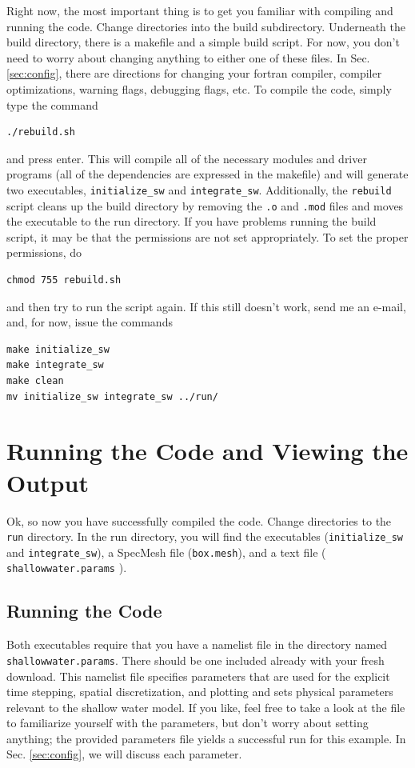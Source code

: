 \documentclass{softwaremanual}
\begin{document}
Right now, the most important thing is to get you familiar with compiling and running the code. Change directories into the build subdirectory. Underneath the build directory, there is a makefile and a simple build script. For now, you don't need to worry about changing anything to either one of these files. In Sec. \ref{sec:config}, there are directions for changing your fortran compiler, compiler optimizations, warning flags, debugging flags, etc. To compile the code, simply type the command
\begin{verbatim}
./rebuild.sh
\end{verbatim}
and press enter. This will compile all of the necessary modules and  driver programs (all of the dependencies are expressed in the makefile) and will generate two executables, \texttt{initialize\_sw} and \texttt{integrate\_sw}. Additionally, the \texttt{rebuild} script cleans up the build directory by removing the \texttt{.o} and \texttt{.mod} files and moves the executable to the run directory. If you have problems running the build script, it may be that the permissions are not set appropriately. To set the proper permissions, do
\begin{verbatim}
chmod 755 rebuild.sh
\end{verbatim}
and then try to run the script again. If this still doesn't work, send me an e-mail, and, for now, issue the commands
\begin{verbatim}
make initialize_sw
make integrate_sw
make clean
mv initialize_sw integrate_sw ../run/
\end{verbatim}

\section{Running the Code and Viewing the Output}
Ok, so now you have successfully compiled the code. Change directories to the \texttt{run} directory. In the run directory, you will find the executables (\texttt{initialize\_sw} and \texttt{integrate\_sw}), a SpecMesh file (\texttt{box.mesh}), and a text file ( \texttt{shallowwater.params} ).

\subsection{Running the Code}
Both executables require that you have a namelist file in the directory named \texttt{shallowwater.params}. There should be one included already with your fresh download. This namelist file specifies parameters that are used for the explicit time stepping, spatial discretization, and plotting and sets physical parameters relevant to the shallow water model. If you like, feel free to take a look at the file to familiarize yourself with the parameters, but don't worry about setting anything; the provided parameters file yields a successful run for this example. In Sec. \ref{sec:config}, we will discuss each parameter.
\end{document}
